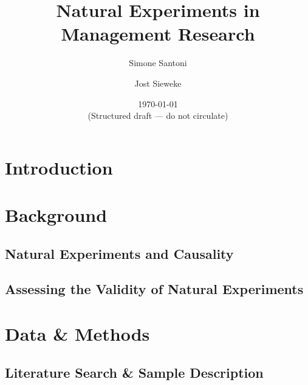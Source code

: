 \documentclass[nobib]{tufte-handout}
\title[Natural Experiments in Management Research]
{Natural Experiments in Management Research\vspace{2em}}
\author[$\bullet\circ$]{Simone Santoni}
\author[$\star$]{Jost Sieweke}
\affil[$\bullet$]{Bayes Business School (formerly Cass)}
\affil[$\circ$]{Soundcloud}
\affil[$\star$]{Vrije Universiteit Amsterdam}
\date{\vspace{1em} \normalsize \today \vspace{1em} \\ 
      \textcolor{RedOrange}{(Structured draft --- do not circulate)}}
\begin{document}
\maketitle

%
%
%

\clearpage

\begin{refsection}

\section{Introduction}
\label{introduction}



\section{Background}
\label{sec:background}

\subsection{Natural Experiments and Causality}
\label{subsec:nes_and_causality}



\subsection{Assessing the Validity of Natural Experiments}
\label{subsec:ne_validity}



\section{Data \& Methods}
\label{sec:data_and_methods}

\subsection{Literature Search \& Sample Description}
\label{subsec:literature_search_and_sample_description}




\end{refsection}
\end{document}
